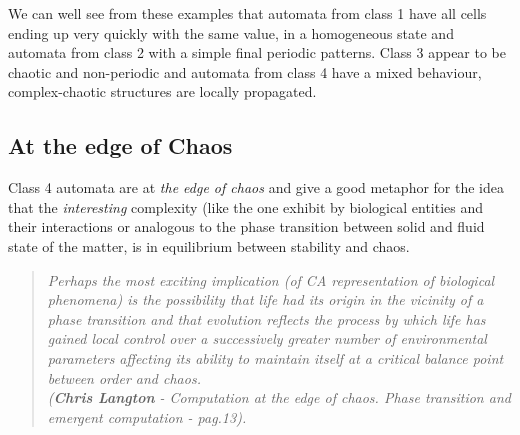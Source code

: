 We can well see from these examples that automata from class 1 have all cells
ending up very quickly with the same value, in a homogeneous state and automata
from class 2 with a simple final periodic patterns.
Class 3 appear to be chaotic and non-periodic and automata from class 4 have
a mixed behaviour, complex-chaotic structures are locally propagated.
\subsection{At the edge of Chaos}
Class 4 automata are at \emph{the edge of chaos} and give a good metaphor for
the idea that the \textit{interesting} complexity (like the one exhibit by
biological entities and their interactions or analogous to the phase transition
between solid and fluid state of the matter, is in equilibrium between
stability and chaos\cite{Langton1990}.

\begin{quotation}
\em Perhaps the most exciting implication (of CA representation of biological
phenomena) is the possibility that life had its origin in the vicinity of a
phase transition and that evolution reflects the process by which life has
gained local control over a successively greater number of environmental
parameters affecting its ability to maintain itself at a critical balance point
between order and chaos.\\
(\textit{\textbf{Chris Langton} - Computation at the edge of chaos.
Phase transition and emergent computation - pag.13}).
\end{quotation}

